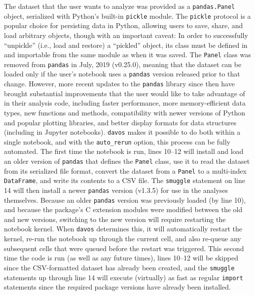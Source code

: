 \documentclass[preprint,12pt,a4paper]{elsarticle}
\begin{document}
The dataset that the user wants to analyze was provided as a \texttt{pandas.Panel} object, serialized with Python's built-in \texttt{pickle} module. The \texttt{pickle} protocol is a popular choice for persisting data in Python, allowing users to save, share, and load arbitrary objects, though with an important caveat: 
In order to successfully ``unpickle'' (i.e., load and restore) a ``pickled'' object, its class must be defined in and importable from the same module as when it was saved.
The \texttt{Panel} class was removed from \texttt{pandas} in July, 2019 (v0.25.0), meaning that the dataset can be loaded only if the user's notebook uses a \texttt{pandas} version released prior to that change. However, more recent updates to the \texttt{pandas} library since then have brought substantial improvements that the user would like to take advantage of in their analysis code, including faster performance, more memory-efficient data types, new functions and methods, compatibility with newer versions of Python and popular plotting libraries, and better display formats for data structures (including in Jupyter notebooks).
\texttt{davos} makes it possible to do both within a single notebook, and with the \texttt{auto\_rerun} option, this process can be fully automated. The first time the notebook is run, lines 10--12 will install and load an older version of \texttt{pandas} that defines the \texttt{Panel} class, use it to read the dataset from its serialized file format, convert the dataset from a \texttt{Panel} to a multi-index \texttt{DataFrame}, and write its contents to a CSV file. The \texttt{smuggle} statement on line 14 will then install a newer \texttt{pandas} version (v1.3.5) for use in the analyses themselves. Because an older \texttt{pandas} version was previously loaded (by line 10), and because the package's C extension modules were modified between the old and new versions, switching to the new version will require restarting the notebook kernel. When \texttt{davos} determines this, it will automatically restart the kernel, re-run the notebook up through the current cell, and also re-queue any subsequent cells that were queued before the restart was triggered. This second time the code is run (as well as any future times), lines 10--12 will be skipped since the CSV-formatted dataset has already been created, and the \texttt{smuggle} statements up through line 14 will execute (virtually) as fast as regular \texttt{import} statements since the required package versions have already been installed.
\end{document}
